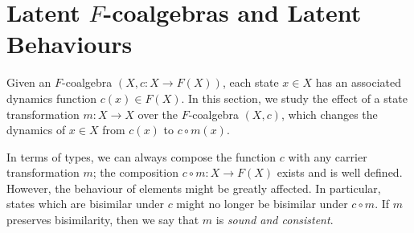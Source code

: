  
\section{Latent \texorpdfstring{$F$-coalgebras and Latent Behaviours}{F-coalgebras and Latent Behaviours}}
Given an $F$-coalgebra $(X,c\colon X\rightarrow F(X))$, each state $x\in X$ has an associated dynamics function $c(x)\in F(X)$. In this section, we study the effect of a state transformation $m\colon X\rightarrow X$ over the $F$-coalgebra $(X,c)$, which changes the dynamics of $x\in X$ from $c(x)$ to $c\circ m(x)$. 

In terms of types, we can always compose the function $c$ with any carrier transformation $m$; the composition $c \circ m\colon X\rightarrow F(X)$ exists and is well defined. However, the behaviour of elements might be greatly affected. In particular, states which are bisimilar under $c$ might no longer be bisimilar under $c \circ m$. If $m$ preserves bisimilarity, then we say that $m$ is \emph{sound and consistent}.

